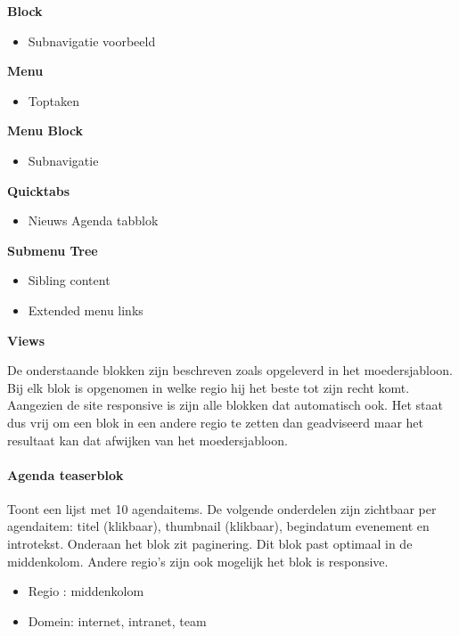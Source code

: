 \textbf{Block}

\begin{itemize}
\item Subnavigatie voorbeeld
\end{itemize}

\textbf{Menu}

\begin{itemize}
\item Toptaken
\end{itemize}

\textbf{Menu Block}

\begin{itemize}
\item Subnavigatie
\end{itemize}

\textbf{Quicktabs}

\begin{itemize}
\item Nieuws Agenda tabblok
\end{itemize}

\textbf{Submenu Tree}

\begin{itemize}
\item Sibling content
\item Extended menu links
\end{itemize}

\textbf{Views}

De onderstaande blokken zijn beschreven zoals opgeleverd in het moedersjabloon. Bij elk blok is opgenomen in welke regio hij het beste tot zijn recht komt. Aangezien de site responsive is zijn alle blokken dat automatisch ook. Het staat dus vrij om een blok in een andere regio te zetten dan geadviseerd maar het resultaat kan dat afwijken van het moedersjabloon.

\paragraph{Agenda teaserblok}

Toont een lijst met 10 agendaitems. De volgende onderdelen zijn zichtbaar per agendaitem: titel (klikbaar), thumbnail (klikbaar), begindatum evenement en introtekst. Onderaan het blok zit paginering. Dit blok past optimaal in de middenkolom. Andere regio's zijn ook mogelijk het blok is responsive.

\begin{itemize}
\item Regio : middenkolom
\item Domein: internet, intranet, team
\end{itemize}

